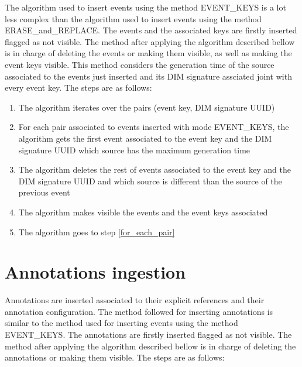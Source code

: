 The algorithm used to insert events using the method EVENT\_KEYS is a lot less complex than the algorithm used to insert events using the method ERASE\_and\_REPLACE.
The events and the associated keys are firstly inserted flagged as not visible. The method after applying the algorithm described bellow is in charge of deleting the events or making them visible, as well as making the event keys visible.
This method considers the generation time of the source associated to the events just inserted and its DIM signature assciated joint with every event key.
The steps are as follows:

\begin{enumerate}

\item The algorithm iterates over the pairs (event key, DIM signature UUID)
\item \label{for_each_pair} For each pair associated to events inserted with mode EVENT\_KEYS, the algorithm gets the first event associated to the event key and the DIM signature UUID which source has the maximum generation time
\item The algorithm deletes the rest of events associated to the event key and the DIM signature UUID and which source is different than the source of the previous event
\item The algorithm makes visible the events and the event keys associated
\item The algorithm goes to step \ref{for_each_pair}
\end{enumerate}

\section{Annotations ingestion}

Annotations are inserted associated to their explicit references and their annotation configuration.
The method followed for inserting annotations is similar to the method used for inserting events using the method EVENT\_KEYS.
The annotations are firstly inserted flagged as not visible. The method after applying the algorithm described bellow is in charge of deleting the annotations or making them visible.
The steps are as follows:

